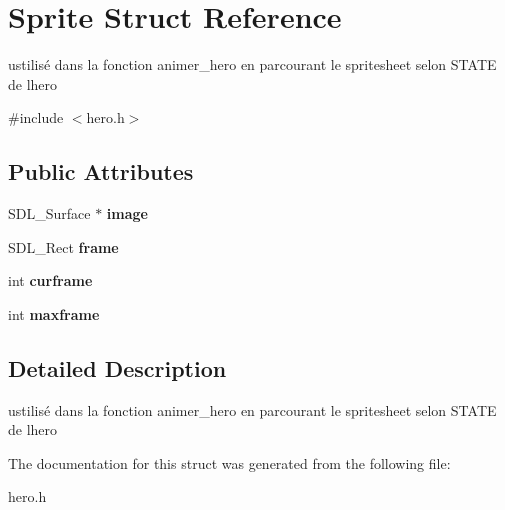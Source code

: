 \hypertarget{structSprite}{}\section{Sprite Struct Reference}
\label{structSprite}


ustilisé dans la fonction animer\+\_\+hero en parcourant le spritesheet selon S\+T\+A\+TE de l\textquotesingle{}hero  




{\ttfamily \#include $<$hero.\+h$>$}

\subsection*{Public Attributes}
\begin{DoxyCompactItemize}
\item 
\mbox{\label{structSprite_a80402c358e003c422aa75bec2b6d0099}} 
S\+D\+L\+\_\+\+Surface $\ast$ {\bfseries image}
\item 
\mbox{\label{structSprite_a3dab174a504c158e143e41960b7354f6}} 
S\+D\+L\+\_\+\+Rect {\bfseries frame}
\item 
\mbox{\label{structSprite_a17956b3b5b551706a5aedde0bd06a234}} 
int {\bfseries curframe}
\item 
\mbox{\label{structSprite_a0bbc4bad956af279f94539d476d9b9d2}} 
int {\bfseries maxframe}
\end{DoxyCompactItemize}


\subsection{Detailed Description}
ustilisé dans la fonction animer\+\_\+hero en parcourant le spritesheet selon S\+T\+A\+TE de l\textquotesingle{}hero 

The documentation for this struct was generated from the following file\+:\begin{DoxyCompactItemize}
\item 
hero.\+h\end{DoxyCompactItemize}
